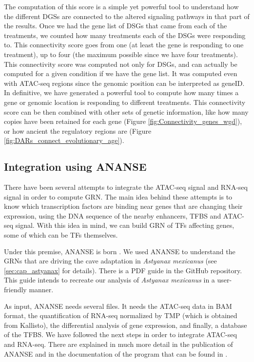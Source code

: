 The computation of this score is a simple yet powerful tool to understand how the different DGSs are connected to the altered signaling pathways in that part of the results. Once we had the gene list of DSGs that came from each of the treatments, we counted how many treatments each of the DSGs were responding to. This connectivity score goes from one (at least the gene is responding to one treatment), up to four (the maximum possible since we have four treatments). This connectivity score was computed not only for DSGs, and can actually be computed for a given condition if we have the gene list. It was computed even with ATAC-seq regions since the genomic position can be interpreted as geneID. In definitive, we have generated a powerful tool to compute how many times a gene or genomic location is responding to different treatments. This connectivity score can be then combined with other sets of genetic information, like how many copies have been retained for each gene (Figure \ref{fig:Connectivity_genes_wgd}), or how ancient the regulatory regions are (Figure \ref{fig:DARs_connect_evolutionary_age}).


\subsection{Integration using ANANSE}

There have been several attempts to integrate the ATAC-seq signal and RNA-seq signal in order to compute GRN. The main idea behind these attempts is to know which transcription factors are binding near genes that are changing their expression, using the DNA sequence of the nearby enhancers, TFBS and ATAC-seq signal. With this idea in mind, we can build GRN of TFs affecting genes, some of which can be TFs themselves.

Under this premise, ANANSE is born \parencite{xu_ananse_2021}. We used ANANSE to understand the GRNs that are driving the cave adaptation in \textit{Astyanax mexicanus} (see \ref{sec:cap_astyanax} for details). There is a PDF guide in the GitHub repository. This guide intends to recreate our analysis of \textit{Astyanax mexicanus} in a user-friendly manner.

As input, ANANSE needs several files. It needs the ATAC-seq data in BAM format, the quantification of RNA-seq normalized by TMP (which is obtained from Kallisto), the differential analysis of gene expression, and finally, a database of the TFBS. We have followed the next steps in order to integrate ATAC-seq and RNA-seq. There are explained in much more detail in the publication of ANANSE and in the documentation of the program that can be found in .

